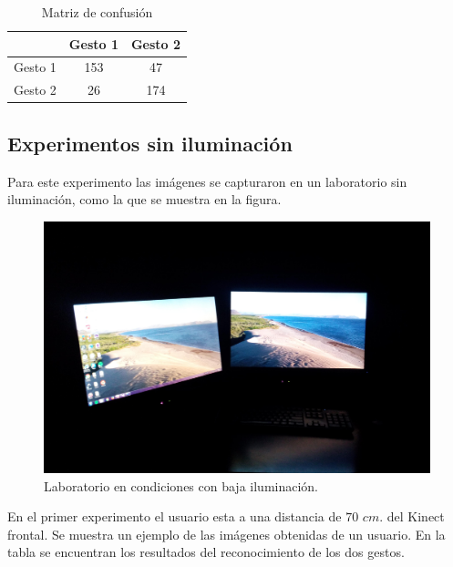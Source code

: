 \begin{table}[h!] 
\begin{center}
\begin{tabular}{ r || c | c |} 
 
        & Gesto 1 & Gesto 2 \\ \hline \hline  
Gesto 1 & 153     &  47     \\ \hline  
Gesto 2 & 26      & 174     \\   

\end{tabular}
\end{center} 
\caption{Matriz de confusión}
\end{table}


\subsection{Experimentos sin iluminación}
Para este experimento las imágenes se capturaron en un laboratorio sin iluminación, como la que se muestra en la figura.

\begin{figure}[h!]
\begin{center} 
\includegraphics[scale=0.09]{./Figures/noIluminacion.jpg}
\end{center}
\caption{Laboratorio en condiciones con baja iluminación.}
\label{fig:LabNoIluminado} 
\end{figure} 


En el primer experimento el usuario esta a una distancia de $70$ $cm.$ del Kinect frontal. Se muestra un ejemplo de las imágenes obtenidas de un usuario. En la tabla se encuentran los resultados del reconocimiento de los dos gestos.  

